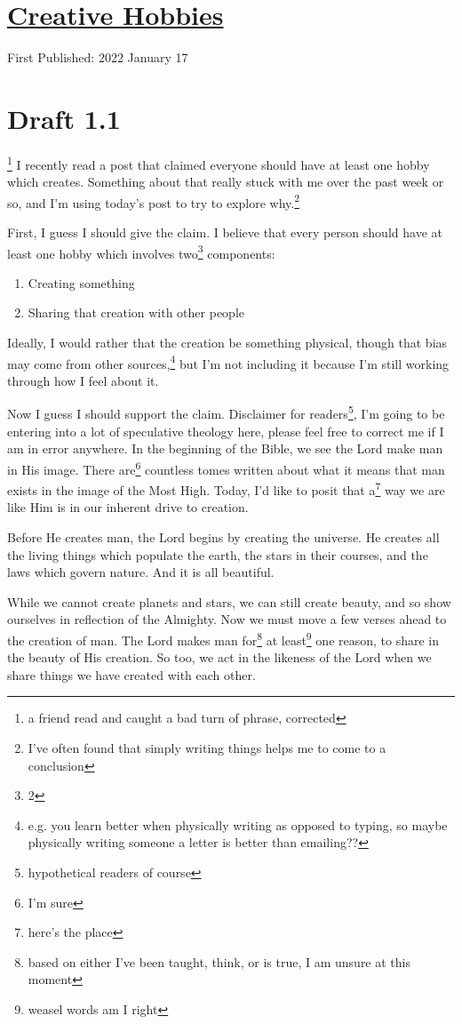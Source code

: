 \documentclass[12pt]{article}[titlepage]
\newcommand{\1}{\={a}}
\newcommand{\2}{\={e}}
\newcommand{\3}{\={\i}}
\newcommand{\4}{\=o}
\newcommand{\5}{\=u}
\newcommand{\6}{\={A}}
\renewcommand{\,}{\textsuperscript{,}}
\begin{document}
\doublespacing
\section{\href{creative-hobbies.html}{Creative Hobbies}}
First Published: 2022 January 17

\section{Draft 1.1}\footnote{a friend read and caught a bad turn of phrase, corrected}
I recently read a post that claimed everyone should have at least one hobby which creates.
Something about that really stuck with me over the past week or so, and I'm using today's post to try to explore why.\footnote{I've often found that simply writing things helps me to come to a conclusion}

First, I guess I should give the claim.
I believe that every person should have at least one hobby which involves two\footnote{2} components:
\begin{enumerate}
\item Creating something
\item Sharing that creation with other people
\end{enumerate}
Ideally, I would rather that the creation be something physical, though that bias may come from other sources,\footnote{e.g. you learn better when physically writing as opposed to typing, so maybe physically writing someone a letter is better than emailing??} but I'm not including it because I'm still working through how I feel about it.

Now I guess I should support the claim.
Disclaimer for readers\footnote{hypothetical readers of course}, I'm going to be entering into a lot of speculative theology here, please feel free to correct me if I am in error anywhere.
In the beginning of the Bible, we see the Lord make man in His image.
There are\footnote{I'm sure} countless tomes written about what it means that man exists in the image of the Most High.
Today, I'd like to posit that a\footnote{here's the place} way we are like Him is in our inherent drive to creation.

Before He creates man, the Lord begins by creating the universe.
He creates all the living things which populate the earth, the stars in their courses, and the laws which govern nature.
And it is all beautiful.

While we cannot create planets and stars, we can still create beauty, and so show ourselves in reflection of the Almighty.
Now we must move a few verses ahead to the creation of man.
The Lord makes man for\footnote{based on either I've been taught, think, or is true, I am unsure at this moment} at least\footnote{weasel words am I right} one reason, to share in the beauty of His creation.
So too, we act in the likeness of the Lord when we share things we have created with each other.
\end{document}
